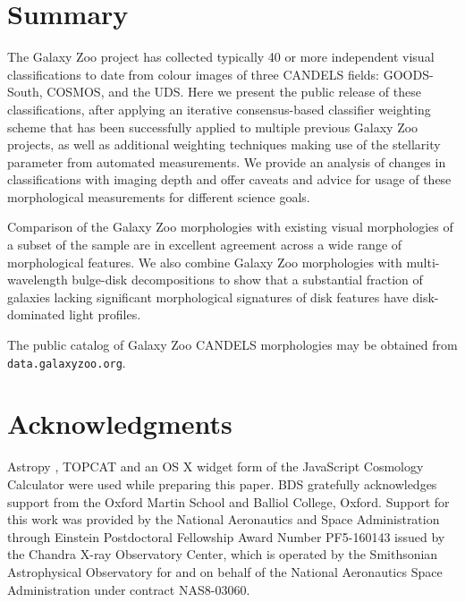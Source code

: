\documentclass[useAMS,usenatbib]{mn2e}
\begin{document}
{%
%
%  
\section{Summary}\label{sec:summary}
%
%

The Galaxy Zoo project has collected typically 40 or more independent visual classifications to date from colour images of three CANDELS fields: GOODS-South, COSMOS, and the UDS. Here we present the public release of these classifications, after applying an iterative consensus-based classifier weighting scheme that has been successfully applied to multiple previous Galaxy Zoo projects, as well as additional weighting techniques making use of the stellarity parameter from automated measurements. We provide an analysis of changes in classifications with imaging depth and offer caveats and advice for usage of these morphological measurements for different science goals. 

Comparison of the Galaxy Zoo morphologies with existing visual morphologies of a subset of the sample are in excellent agreement across a wide range of morphological features. We also combine Galaxy Zoo morphologies with multi-wavelength bulge-disk decompositions to show that a substantial fraction of galaxies lacking significant morphological signatures of disk features have disk-dominated light profiles.

The public catalog of Galaxy Zoo CANDELS morphologies may be obtained from {\tt data.galaxyzoo.org}.
  
%
%
\section*{Acknowledgments}
%
%

Astropy \citep{astropy13}, TOPCAT \citep{taylor05} and an OS X widget form of the JavaScript Cosmology Calculator \citep{wright06,rsimpson13} were used while preparing this paper. 
%
BDS gratefully acknowledges support from the Oxford Martin School and Balliol College, Oxford. Support for this work was provided by the National Aeronautics and Space Administration through Einstein Postdoctoral Fellowship Award Number PF5-160143 issued by the Chandra X-ray Observatory Center, which is operated by the Smithsonian Astrophysical Observatory for and on behalf of the National Aeronautics Space Administration under contract NAS8-03060.
%
%
%
%
%
%

}
\end{document}
